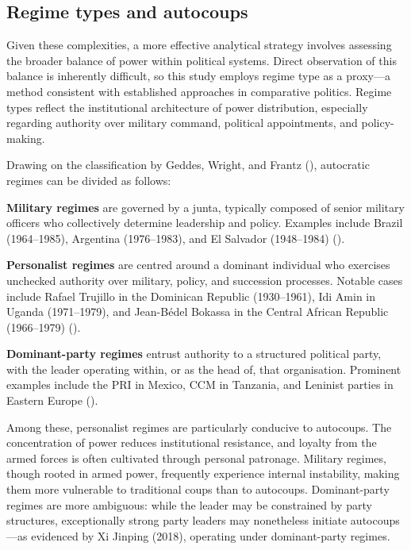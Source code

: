 \documentclass[
  12pt,
]{report}
\begin{document}
\subsection*{Regime types and
autocoups}\label{regime-types-and-autocoups}

Given these complexities, a more effective analytical strategy involves
assessing the broader balance of power within political systems. Direct
observation of this balance is inherently difficult, so this study
employs regime type as a proxy---a method consistent with established
approaches in comparative politics. Regime types reflect the
institutional architecture of power distribution, especially regarding
authority over military command, political appointments, and
policy-making.

Drawing on the classification by Geddes, Wright, and Frantz
(), autocratic regimes can be divided as
follows:

\textbf{Military regimes} are governed by a junta, typically composed of
senior military officers who collectively determine leadership and
policy. Examples include Brazil (1964--1985), Argentina (1976--1983),
and El Salvador (1948--1984) ().

\textbf{Personalist regimes} are centred around a dominant individual
who exercises unchecked authority over military, policy, and succession
processes. Notable cases include Rafael Trujillo in the Dominican
Republic (1930--1961), Idi Amin in Uganda (1971--1979), and Jean-Bédel
Bokassa in the Central African Republic (1966--1979)
().

\textbf{Dominant-party regimes} entrust authority to a structured
political party, with the leader operating within, or as the head of,
that organisation. Prominent examples include the PRI in Mexico, CCM in
Tanzania, and Leninist parties in Eastern Europe
().

Among these, personalist regimes are particularly conducive to
autocoups. The concentration of power reduces institutional resistance,
and loyalty from the armed forces is often cultivated through personal
patronage. Military regimes, though rooted in armed power, frequently
experience internal instability, making them more vulnerable to
traditional coups than to autocoups. Dominant-party regimes are more
ambiguous: while the leader may be constrained by party structures,
exceptionally strong party leaders may nonetheless initiate
autocoups---as evidenced by Xi Jinping (2018), operating under
dominant-party regimes.
\end{document}
